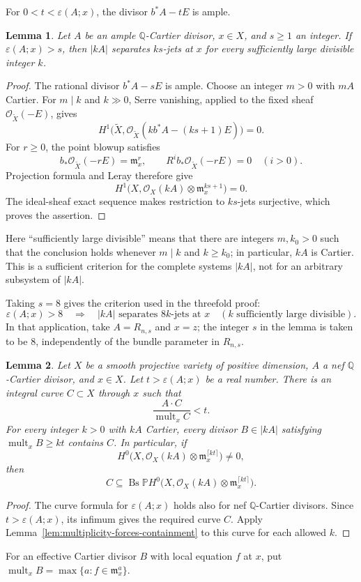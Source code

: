 \documentclass[12pt,a4paper,psamsfonts]{amsart}
\newtheorem{lemma}{Lemma}[section]
\theoremstyle{definition}
\newcommand{\OO}{\mathcal O}
\begin{document}
For $0<t<\varepsilon(A;x)$, the divisor $b^*A-tE$ is ample.

\begin{lemma}\label{lem:seshadri-jet-separation}
Let $A$ be an ample $\mathbb{Q}$-Cartier divisor, $x\in X$, and
$s\ge1$ an integer. If $\varepsilon(A;x)>s$, then
$|kA|$ separates $ks$-jets at $x$ for every sufficiently large
divisible integer $k$.
\end{lemma}
\begin{proof}
The rational divisor $b^*A-sE$ is ample. Choose an integer $m>0$
with $mA$ Cartier. For $m\mid k$ and $k\gg0$, Serre vanishing,
applied to the fixed sheaf $\OO_{\widetilde X}(-E)$, gives
\[
 H^1\bigl(\widetilde X,
       \OO_{\widetilde X}(kb^*A-(ks+1)E)\bigr)=0.
\]
For $r\ge0$, the point blowup satisfies
\[
 b_*\OO_{\widetilde X}(-rE)=\mathfrak m_x^r,
 \qquad R^ib_*\OO_{\widetilde X}(-rE)=0\quad(i>0).
\]
Projection formula and Leray therefore give
\[
 H^1\bigl(X,\OO_X(kA)\otimes\mathfrak m_x^{ks+1}\bigr)=0.
\]
The ideal-sheaf exact sequence makes restriction to $ks$-jets
surjective, which proves the assertion.
\end{proof}
Here ``sufficiently large divisible'' means that there are integers
$m,k_0>0$ such that the conclusion holds whenever $m\mid k$ and
$k\ge k_0$; in particular, $kA$ is Cartier.
This is a sufficient criterion for the complete systems $|kA|$,
not for an arbitrary subsystem of $|kA|$.

Taking $s=8$ gives the criterion used in the threefold proof:
\[
 \varepsilon(A;x)>8
 \quad\Longrightarrow\quad
 |kA|\text{ separates }8k\text{-jets at }x
 \quad(k\text{ sufficiently large divisible}).
\]
In that application, take $A=R_{n,s}$ and $x=z$; the integer $s$
in the lemma is taken to be $8$, independently of the bundle
parameter in $R_{n,s}$.

\begin{lemma}\label{lem:small-seshadri-base-curve}
Let $X$ be a smooth projective variety of positive dimension,
$A$ a nef $\mathbb{Q}$-Cartier divisor, and $x\in X$.
Let $t>\varepsilon(A;x)$ be a real number. There is an integral curve
$C\subset X$ through $x$ such that
\[
 \frac{A\cdot C}{\operatorname{mult}_x C}<t.
\]
For every integer $k>0$ with $kA$ Cartier, every divisor
$B\in|kA|$ satisfying $\operatorname{mult}_x B\ge kt$ contains $C$.
In particular, if
\[
 H^0\bigl(X,\OO_X(kA)\otimes
                \mathfrak m_x^{\lceil kt\rceil}\bigr)\ne0,
\]
then
\[
 C\subseteq\operatorname{Bs}\mathbb P H^0\bigl(
 X,\OO_X(kA)\otimes\mathfrak m_x^{\lceil kt\rceil}\bigr).
\]
\end{lemma}
\begin{proof}
The curve formula for $\varepsilon(A;x)$ holds also for nef
$\mathbb{Q}$-Cartier divisors. Since $t>\varepsilon(A;x)$, its
infimum gives the required curve $C$.
Apply Lemma~\ref{lem:multiplicity-forces-containment} to this
curve for each allowed $k$.
\end{proof}
For an effective Cartier divisor $B$ with local equation $f$ at
$x$, put $\operatorname{mult}_x B=\max\{a:f\in\mathfrak m_x^a\}$.
\end{document}
